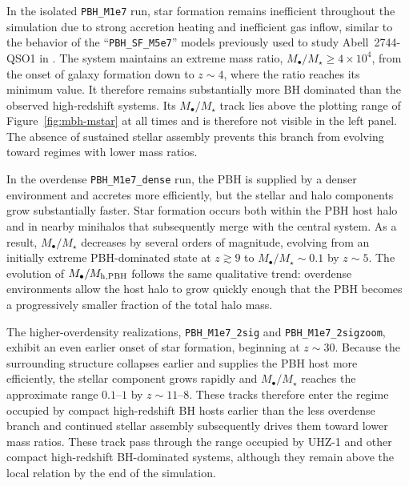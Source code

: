 \documentclass[twocolumn,trackchanges]{aastex701}
\begin{document}
In the isolated \texttt{PBH\_M1e7} run, star formation remains inefficient throughout the simulation due to strong accretion heating and inefficient gas inflow, similar to the behavior of the ``\texttt{PBH\_SF\_M5e7}'' models previously used to study Abell~2744-QSO1 in \citet{Zhang2026PBHApJL}. The system maintains an extreme mass ratio, $M_\bullet/M_\star\geq 4\times 10^4$, from the onset of galaxy formation down to $z\sim4$, where the ratio reaches its minimum value. It therefore remains substantially more BH dominated than the observed high-redshift systems. Its $M_\bullet/M_\star$ track lies above the plotting range of Figure~\ref{fig:mbh-mstar} at all times and is therefore not visible in the left panel. The absence of sustained stellar assembly prevents this branch from evolving toward regimes with lower mass ratios.

In the overdense \texttt{PBH\_M1e7\_dense} run, the PBH is supplied by a denser environment and accretes more efficiently, but the stellar and halo components grow substantially faster. Star formation occurs both within the PBH host halo and in nearby minihalos that subsequently merge with the central system. As a result, $M_\bullet/M_\star$ decreases by several orders of magnitude, evolving from an initially extreme PBH-dominated state at $z\gtrsim9$ to $M_\bullet/M_\star\sim0.1$ by $z\sim5$. The evolution of $M_\bullet/M_{\rm h,PBH}$ follows the same qualitative trend: overdense environments allow the host halo to grow quickly enough that the PBH becomes a progressively smaller fraction of the total halo mass. 



The higher-overdensity realizations, \texttt{PBH\_M1e7\_2sig} and \texttt{PBH\_M1e7\_2sigzoom}, exhibit an even earlier onset of star formation, beginning at $z\sim30$. Because the surrounding structure collapses earlier and supplies the PBH host more efficiently, the stellar component grows rapidly and $M_\bullet/M_\star$ reaches the approximate range $0.1$--$1$ by $z\sim11$--$8$. These tracks therefore enter the regime occupied by compact high-redshift BH hosts earlier than the less overdense branch and continued stellar assembly subsequently drives them toward lower mass ratios. These track pass through the range occupied by UHZ-1 and other compact high-redshift BH-dominated systems, although they remain above the local relation by the end of the simulation.
\end{document}
